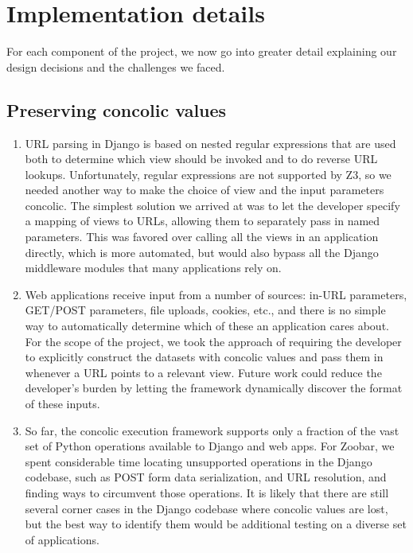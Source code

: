 \documentclass{article}
\begin{document}
\section{Implementation details}

For each component of the project, we now go into greater detail explaining our
design decisions and the challenges we faced.

\subsection{Preserving concolic values}

\begin{enumerate}
\item URL parsing in Django is based on nested regular expressions
  that are used both to determine which view should be invoked and to do
  reverse URL lookups.
  Unfortunately, regular expressions are not supported by Z3, so we
  needed another way to make the choice of view and the input
  parameters concolic. The simplest solution we arrived at was to
  let the developer specify a mapping of views to URLs, allowing them to
  separately pass in
  named parameters. This was favored over calling all the views in an
  application directly, which is more automated, but would also
  bypass all the Django middleware modules that many applications
  rely on.

\item Web applications receive input from a number of sources: in-URL
  parameters, GET/POST parameters, file uploads, cookies, etc., and
  there is no simple way to automatically determine which of these an
  application cares about. For the scope of the project, we took the
  approach of requiring the developer to explicitly construct the
  datasets with concolic values and pass them in whenever a URL points
  to a relevant view. Future work could reduce the developer's burden
  by letting the framework dynamically discover the format of these inputs.

\item So far, the concolic execution framework supports only a
  fraction of the vast set of Python operations available to Django
  and web apps. For Zoobar, we spent considerable time locating
  unsupported operations in the Django codebase, such as POST form
  data serialization, and URL resolution, and finding ways to circumvent those
  operations. It is likely that there are still several corner cases
  in the Django codebase where concolic values are lost, but the best
  way to identify them would be additional testing on a diverse set of
  applications.
\end{enumerate}
\end{document}
